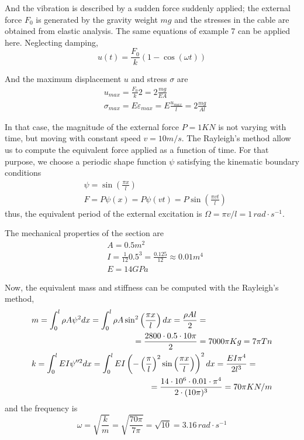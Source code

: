\documentclass{problems}
\begin{document}
And the vibration is described by a sudden force suddenly applied; the external force $F_0$ is generated by the gravity weight $mg$ and the stresses in the cable are obtained from elastic analysis. The same equations of example 7 can be applied here. Neglecting damping,
$$
u(t) = \frac{F_0}{k}(1 -\cos(\omega t))
$$

And the maximum displacement $u$ and stress $\sigma$ are
\begin{align*}
&u_{max} = \frac{F_0}{k}2 = 2\frac{mg}{EA} \\
&\sigma_{max} = E\varepsilon_{max} = E\frac{u_{max}}{l} = 2\frac{mg}{Al}
\end{align*}



In that case, the magnitude of the external force $P=1KN$ is not varying with time, but moving with constant speed $v=10m/s$. The Rayleigh's method allow us to compute the equivalent force applied as a function of time. For that purpose, we choose a periodic shape function $\psi$ satisfying the kinematic boundary conditions
\begin{align*}
&\psi = \sin\left(\frac{\pi x}{l}\right) \\
&F = P\psi(x) = P\psi(vt) = P\sin\left(\frac{\pi vt}{l}\right)
\end{align*}
thus, the equivalent period of the external excitation is $\Omega = \pi v/l = 1\,rad\cdot s^{-1}$.

The mechanical properties of the section are
\begin{align*}
&A = 0.5m^2 \\
&I = \frac{1}{12}0.5^3 = \frac{0.125}{12} \approx 0.01 m^4\\
&E = 14GPa
\end{align*}

Now, the equivalent mass and stiffness can be computed with the Rayleigh's method,
\begin{align*}
&m = \int_0^l \rho A\psi^2dx = \int_0^l \rho A\sin^2\left(\frac{\pi x}{l}\right)dx = \frac{\rho Al}{2} = \\
& \pushright{= \frac{2800 \cdot 0.5 \cdot 10\pi}{2} = 7000\pi Kg = 7\pi Tn} \\
&k = \int_0^l EI\psi''^2dx = \int_0^l EI\left(-\left(\frac{\pi}{l}\right)^2\sin\left(\frac{\pi x}{l}\right)\right)^2dx = \frac{EI\pi^4}{2l^3} = \qquad \\
& \pushright{= \frac{14\cdot 10^6 \cdot 0.01 \cdot \pi^4}{2 \cdot (10\pi)^3} =
70\pi KN/m}
\end{align*}
and the frequency is
$$
\omega = \sqrt{\frac{k}{m}} = \sqrt{\frac{70\pi}{7\pi}} = \sqrt{10} = 3.16\,rad\cdot s^{-1}
$$
\end{document}
